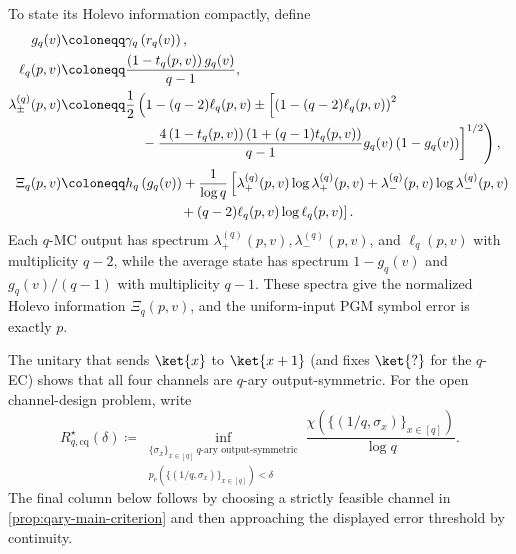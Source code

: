 \documentclass[11pt]{article}
\theoremstyle{remark}
\begin{document}
To state its Holevo information compactly, define
\begin{align*}
g_q(v)
&\coloneqq \gamma_q\left(r_q(v)\right), \\
\ell_q(p,v)
&\coloneqq \frac{\left(1-t_q(p,v)\right)g_q(v)}{q-1}, \\
\lambda_\pm^{(q)}(p,v)
&\coloneqq \frac{1}{2}\left(1-(q-2)\ell_q(p,v)
\pm \left[\left(1-(q-2)\ell_q(p,v)\right)^2\right.\right. \\
&\hspace{5.5em}\left.\left.{}-\frac{4\left(1-t_q(p,v)\right)\left(1+(q-1)t_q(p,v)\right)}{q-1}
g_q(v)\left(1-g_q(v)\right)\right]^{1/2}\right), \\
\Xi_q(p,v)
&\coloneqq h_q\left(g_q(v)\right)
+\frac{1}{\log{q}}\left[\lambda_+^{(q)}(p,v)\log{\lambda_+^{(q)}(p,v)}
+\lambda_-^{(q)}(p,v)\log{\lambda_-^{(q)}(p,v)}\right. \\
&\hspace{8.5em}\left.{}+(q-2)\ell_q(p,v)\log{\ell_q(p,v)}\right].
\end{align*}
Each $q$-MC output has spectrum $\lambda_+^{(q)}(p,v),\lambda_-^{(q)}(p,v)$, and $\ell_q(p,v)$ with multiplicity $q-2$, while the average state has spectrum $1-g_q(v)$ and $g_q(v)/(q-1)$ with multiplicity $q-1$. These spectra give the normalized Holevo information $\Xi_q(p,v)$, and the uniform-input PGM symbol error is exactly $p$.

The unitary that sends $\ket{x}$ to $\ket{x+1}$ (and fixes $\ket{?}$ for the $q$-EC) shows that all four channels are $q$-ary output-symmetric. For the open channel-design problem, write
\begin{equation*}
R_{q,\mathrm{cq}}^\star(\delta)
\coloneqq
\inf_{\substack{\{\sigma_x\}_{x \in [q]}\ \text{$q$-ary output-symmetric}\\
p_{\mathrm{e}}(\{(1/q,\sigma_x)\}_{x \in [q]}) < \delta}}
\frac{\chi(\{(1/q,\sigma_x)\}_{x \in [q]})}{\log{q}}.
\end{equation*}
The final column below follows by choosing a strictly feasible channel in \cref{prop:qary-main-criterion} and then approaching the displayed error threshold by continuity.
\end{document}
